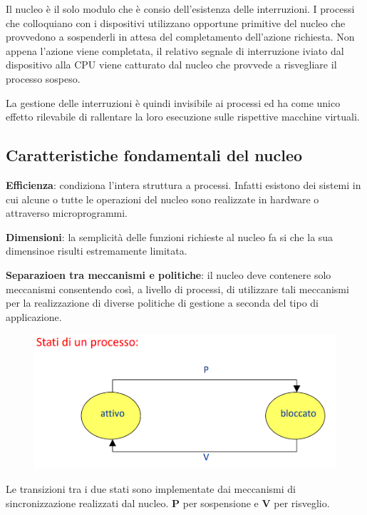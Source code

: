 \documentclass{article}
\begin{document}
Il nucleo è il solo modulo che è consio dell'esistenza delle interruzioni. I processi che colloquiano con i dispositivi utilizzano opportune primitive del
nucleo che provvedono a sospenderli in attesa del completamento dell'azione richiesta. Non appena l'azione viene completata, il relativo segnale di interruzione
iviato dal dispositivo alla CPU viene catturato dal nucleo che provvede a risvegliare il processo sospeso.

La gestione delle interruzioni è quindi invisibile ai processi ed ha come unico effetto rilevabile di rallentare la loro esecuzione sulle rispettive macchine virtuali.

\subsection{Caratteristiche fondamentali del nucleo}

\textbf{Efficienza}: condiziona l'intera struttura a processi. Infatti esistono dei sistemi in cui alcune o tutte le operazioni del nucleo sono realizzate in hardware
o attraverso microprogrammi.

\vspace{3mm}
\textbf{Dimensioni}: la semplicità delle funzioni richieste al nucleo fa si che la sua dimensinoe risulti estremamente limitata.

\vspace{3mm}
\textbf{Separazioen tra meccanismi e politiche}: il nucleo deve contenere solo meccanismi consentendo così, a livello di processi, di utilizzare tali meccanismi per la 
realizzazione di diverse politiche di gestione a seconda del tipo di applicazione.

\begin{figure}[htbp]
    \centering
    \includegraphics[width=0.70\columnwidth]{imgs/processo.PNG}
\end{figure}

Le transizioni tra i due stati sono implementate dai meccanismi di sincronizzazione realizzati dal nucleo. \textbf{P} per sospensione e \textbf{V} per risveglio.
\end{document}
